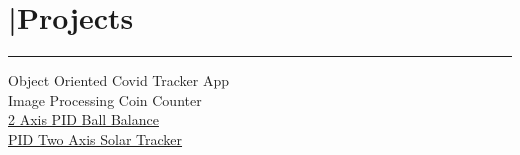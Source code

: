 \section{\textcolor{gold}{\faCogs}|Projects}
\noindent\color{blue}\rule{5.5cm}{0.4pt}
Object Oriented Covid Tracker App\\
Image Processing Coin Counter\\
\href{https://drive.google.com/file/d/1M7hyt1ey8v5MJtEsC4UXhULixhkWbEnc/view?usp=sharing}{2 Axis PID Ball Balance \hfill \faExternalLinkSquare}\\
\href{https://docs.google.com/presentation/d/1kiq9BvSNKeOEwmuxDwN97RE79vUTn9wH/edit?usp=sharing&ouid=109457278993087350745&rtpof=true&sd=true}{PID Two Axis Solar Tracker \hfill \faExternalLinkSquare}\\

\begin{comment}
PID PWM Temperature Control Unit\\
Gaming PC\\
\href{https://github.com/mkeller36/movie_rec}{MovieRecommend-er\hfill \faExternalLinkSquare}
\end{comment}
\sectionsep